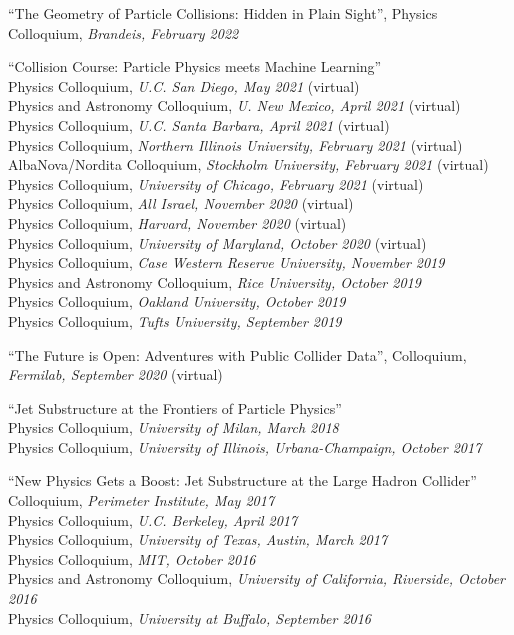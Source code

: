 \item ``The Geometry of Particle Collisions: Hidden in Plain Sight'', Physics Colloquium, \emph{Brandeis, February 2022}

\item ``Collision Course:  Particle Physics meets Machine Learning''
\\ Physics Colloquium, \emph{U.C. San Diego, May 2021} (virtual)
\\ Physics and Astronomy Colloquium, \emph{U. New Mexico, April 2021} (virtual)
\\ Physics Colloquium, \emph{U.C. Santa Barbara, April 2021} (virtual)
\\ Physics Colloquium, \emph{Northern Illinois University, February 2021} (virtual)
\\ AlbaNova/Nordita Colloquium, \emph{Stockholm University, February 2021} (virtual)
\\ Physics Colloquium, \emph{University of Chicago, February 2021} (virtual)
\\ Physics Colloquium, \emph{All Israel, November 2020} (virtual)
\\ Physics Colloquium, \emph{Harvard, November 2020} (virtual)
\\ Physics Colloquium, \emph{University of Maryland, October 2020} (virtual)
\\ Physics Colloquium, \emph{Case Western Reserve University, November 2019}
\\ Physics and Astronomy Colloquium, \emph{Rice University, October 2019}
\\ Physics Colloquium, \emph{Oakland University, October 2019}
\\ Physics Colloquium, \emph{Tufts University, September 2019}

\item ``The Future is Open:  Adventures with Public Collider Data'', Colloquium, \emph{Fermilab, September 2020} (virtual)

\item ``Jet Substructure at the Frontiers of Particle Physics''
\\ Physics Colloquium, \emph{University of Milan, March 2018}
\\ Physics Colloquium, \emph{University of Illinois, Urbana-Champaign, October 2017}

\item ``New Physics Gets a Boost:  Jet Substructure at the Large Hadron Collider''
\\ Colloquium, \emph{Perimeter Institute, May 2017}
\\ Physics Colloquium, \emph{U.C. Berkeley, April 2017}
\\ Physics Colloquium, \emph{University of Texas, Austin, March 2017}
\\ Physics Colloquium, \emph{MIT, October 2016}
\\ Physics and Astronomy Colloquium, \emph{University of California, Riverside, October 2016}
\\ Physics Colloquium, \emph{University at Buffalo, September 2016}

